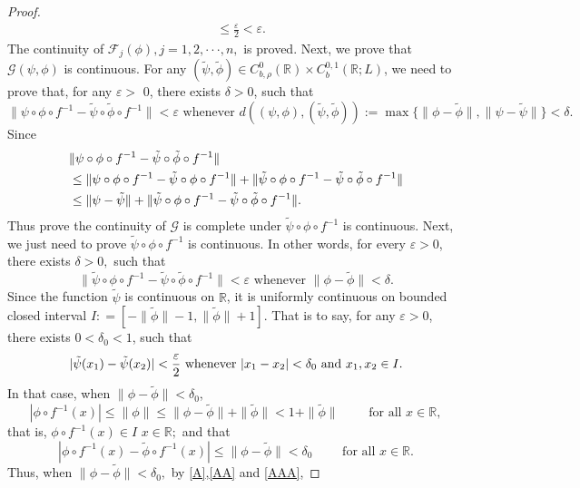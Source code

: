 \documentclass[11pt,reqno,a4paper]{amsart}
\numberwithin{equation}{section}
\renewcommand{\epsilon}{\varepsilon}
\begin{document}
\begin{proof}
\begin{align*}
  &\le \frac{\epsilon}{2} < \epsilon.
  \end{align*}
  The continuity of $\mathcal{F}_j(\phi), j=1,2,\cdot \cdot \cdot,n,$ is proved.  
  Next, we prove that $\mathcal{G} (\psi,\phi)$ is continuous. For any $(\tilde{\psi},\tilde{\phi}) \in C_{b,\rho}^{0} (\mathbb{R}) \times C_{b}^{0,1} (\mathbb{R};L)$, we need to prove that, for any $\epsilon >$ 0, there exists $\delta >0$, such that
  $$\|\psi \circ \phi \circ f^{-1}-\tilde{\psi} \circ \tilde{\phi} \circ f^{-1}\| < \epsilon \text{ whenever } d((\psi,\phi),(\tilde{\psi},\tilde{\phi})):=\max\{\| \phi-\tilde \phi\|,\| \psi-\tilde \psi\|\}<\delta.$$
Since 
\begin{align}
    &\|\psi \circ \phi \circ f^{-1}-\tilde{\psi} \circ \tilde{\phi} \circ f^{-1}\|\notag\\ 
    &\le \|\psi \circ \phi \circ f^{-1}-\tilde{\psi} \circ \phi \circ f^{-1}\|+\|\tilde{\psi} \circ \phi \circ f^{-1}-\tilde{\psi} \circ \tilde{\phi} \circ f^{-1}\|\notag\\
    &\le \|\psi-\tilde \psi\|+\|\tilde{\psi} \circ \phi \circ f^{-1}-\tilde{\psi} \circ \tilde{\phi} \circ f^{-1}\|. \notag
\end{align}
Thus prove the continuity of $\mathcal{G}$ is complete under $\tilde{\psi} \circ \phi \circ f^{-1}$ is continuous. Next, we just need to prove $\tilde{\psi} \circ \phi \circ f^{-1}$ is continuous. In other words, for every $\epsilon >0$, there exists $\delta >0,$ such that
$$\|\tilde{\psi} \circ \phi \circ f^{-1}-\tilde{\psi} \circ \tilde{\phi} \circ f^{-1}\| < \epsilon \text{ whenever } \|\phi-\tilde \phi\|<\delta.$$
Since the function $\tilde \psi$ is continuous on $\mathbb{R}$, it is uniformly continuous on bounded closed interval $I: =[-\|\tilde{\phi}\|-1,\|\tilde{\phi}\|+1]$. That is to say, for any $\epsilon >0$, there exists $0<\delta_0 <1$, such that
\begin{equation}\label{A}
    |\tilde \psi(x_1)-\tilde \psi(x_2)| < \frac{\epsilon}{2} \text{ whenever } |x_1-x_2|<\delta_0  \text{ and } x_1,x_2 \in I.\\
\end{equation}
In that case, when $\|\phi-\tilde{\phi}\| < \delta_0$,
\begin{equation}\label{AA}
    |\phi \circ f^{-1}(x)| \le \|\phi\| \le \|\phi-\tilde{\phi}\|+\|\tilde{\phi}\| < 1+ \|\tilde{\phi}\|
\qquad \text{ for all } x \in \mathbb{R},
\end{equation}
that is, $\phi \circ f^{-1}(x) \in I$  \qquad {} $x \in \mathbb{R};$
and that 
\begin{equation}\label{AAA}
    |\phi \circ f^{-1}(x)-\tilde{\phi} \circ f^{-1}(x)| \le \|\phi-\tilde{\phi}\| < \delta_0 \qquad \text{ for all } x \in \mathbb{R}.
\end{equation}
Thus, when $\|\phi-\tilde{\phi}\| < \delta_0, $ by \eqref{A},\eqref{AA} and \eqref{AAA}, 


\end{proof}
\end{document}
